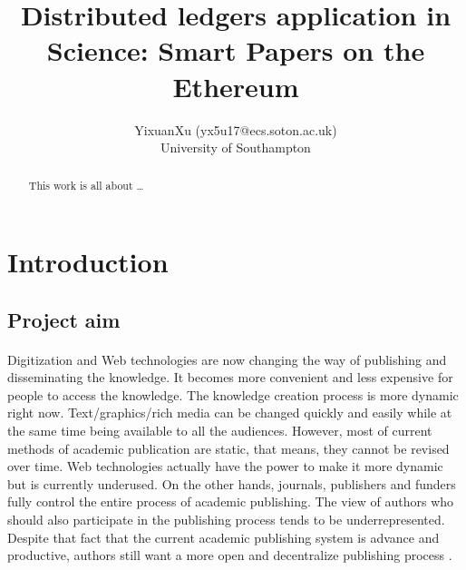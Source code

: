 \documentclass [12pt]{article}
\title{Distributed ledgers application in Science: Smart
Papers on the Ethereum}
\author{YixuanXu (yx5u17@ecs.soton.ac.uk)\\University of Southampton}
\begin{document}
\maketitle
\newpage
\tableofcontents
\newpage
\listoffigures
\newpage
\listoftables
\newpage
\begin{abstract}
	This work is all about \dots
\end{abstract}
\newpage
\section{Introduction}
\subsection{Project aim}
\paragraph{}Digitization and Web technologies are now changing the way of publishing and disseminating the knowledge.
It becomes more convenient and less expensive for people to access the knowledge. 
The knowledge creation process is more dynamic right now. 
Text/graphics/rich media can be changed quickly and easily while at the same time being available to all the audiences.
However, most of current methods of academic publication are static, that means, they cannot be revised over time\cite{heller2014dynamic}. 
Web technologies actually have the power to make it more dynamic but is currently underused. On the other hands, journals, publishers and funders fully control
the entire process of academic publishing. The view of authors who should also participate in the publishing process tends to be underrepresented. 
Despite that fact that the current academic publishing system is advance and productive, 
authors still want a more open and decentralize publishing process \cite{d2018authors}.
\end{document}
